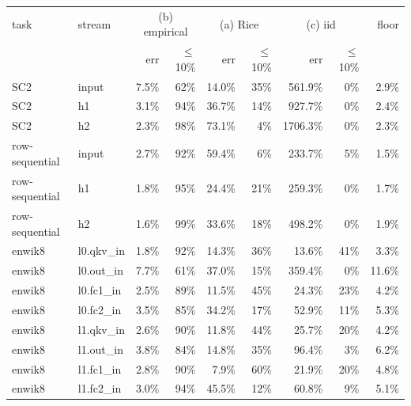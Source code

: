 \begin{tabular}{llrrrrrrr}
\toprule
task & stream & \multicolumn{2}{c}{(b) empirical} & \multicolumn{2}{c}{(a) Rice} & \multicolumn{2}{c}{(c) iid} & floor\\
 & & err & $\le$10\% & err & $\le$10\% & err & $\le$10\% & \\
\midrule
SC2 & input & 7.5\% & 62\% & 14.0\% & 35\% & 561.9\% & 0\% & 2.9\%\\
SC2 & h1 & 3.1\% & 94\% & 36.7\% & 14\% & 927.7\% & 0\% & 2.4\%\\
SC2 & h2 & 2.3\% & 98\% & 73.1\% & 4\% & 1706.3\% & 0\% & 2.3\%\\
row-sequential & input & 2.7\% & 92\% & 59.4\% & 6\% & 233.7\% & 5\% & 1.5\%\\
row-sequential & h1 & 1.8\% & 95\% & 24.4\% & 21\% & 259.3\% & 0\% & 1.7\%\\
row-sequential & h2 & 1.6\% & 99\% & 33.6\% & 18\% & 498.2\% & 0\% & 1.9\%\\
enwik8 & l0.qkv\_in & 1.8\% & 92\% & 14.3\% & 36\% & 13.6\% & 41\% & 3.3\%\\
enwik8 & l0.out\_in & 7.7\% & 61\% & 37.0\% & 15\% & 359.4\% & 0\% & 11.6\%\\
enwik8 & l0.fc1\_in & 2.5\% & 89\% & 11.5\% & 45\% & 24.3\% & 23\% & 4.2\%\\
enwik8 & l0.fc2\_in & 3.5\% & 85\% & 34.2\% & 17\% & 52.9\% & 11\% & 5.3\%\\
enwik8 & l1.qkv\_in & 2.6\% & 90\% & 11.8\% & 44\% & 25.7\% & 20\% & 4.2\%\\
enwik8 & l1.out\_in & 3.8\% & 84\% & 14.8\% & 35\% & 96.4\% & 3\% & 6.2\%\\
enwik8 & l1.fc1\_in & 2.8\% & 90\% & 7.9\% & 60\% & 21.9\% & 20\% & 4.8\%\\
enwik8 & l1.fc2\_in & 3.0\% & 94\% & 45.5\% & 12\% & 60.8\% & 9\% & 5.1\%\\
\bottomrule
\end{tabular}